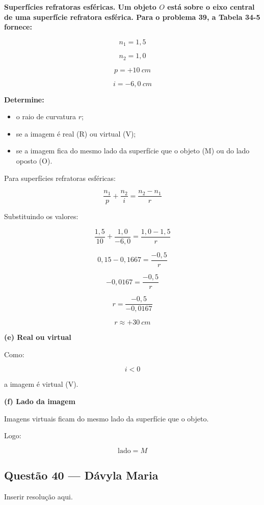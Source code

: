 \documentclass[12pt,a4paper]{article}
\begin{document}
\textbf{Superfícies refratoras esféricas. Um objeto \(O\) está sobre o eixo central de uma superfície refratora esférica. Para o problema 39, a Tabela 34-5 fornece:}

\[
n_1=1,5
\]

\[
n_2=1,0
\]

\[
p=+10\ cm
\]

\[
i=-6,0\ cm
\]

\textbf{Determine:}

\begin{itemize}
\item[(c)] o raio de curvatura \(r\);
\item[(e)] se a imagem é real (R) ou virtual (V);
\item[(f)] se a imagem fica do mesmo lado da superfície que o objeto (M) ou do lado oposto (O).
\end{itemize}

\vspace{0.5cm}

Para superfícies refratoras esféricas:

\[
\frac{n_1}{p}+\frac{n_2}{i}
=
\frac{n_2-n_1}{r}
\]

Substituindo os valores:

\[
\frac{1,5}{10}
+
\frac{1,0}{-6,0}
=
\frac{1,0-1,5}{r}
\]

\[
0,15-0,1667
=
\frac{-0,5}{r}
\]

\[
-0,0167
=
\frac{-0,5}{r}
\]

\[
r=\frac{-0,5}{-0,0167}
\]

\[
r\approx+30\ cm
\]

\vspace{0.5cm}

\textbf{(e) Real ou virtual}

Como:

\[
i<0
\]

a imagem é virtual (V).

\vspace{0.5cm}

\textbf{(f) Lado da imagem}

Imagens virtuais ficam do mesmo lado da superfície que o objeto.

Logo:

\[
\text{lado}=M
\]

\subsection{Questão 40 — Dávyla Maria}
Inserir resolução aqui.
\end{document}
